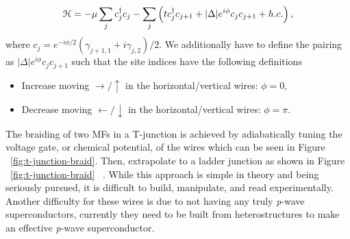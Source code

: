 \begin{equation}
  \mathcal{H} = -\mu \sum_j c^{\dagger}_j c_j - \sum_j \left(tc^{\dagger}_j c_{j+1} + |\Delta|e^{i\phi} c_j c_{j+1} + h.c. \right),
\end{equation}
where
$c_j = e^{-i\phi/2} (\gamma_{j+1,1} + i \gamma_{j,2})/2$.
We additionally have to define the pairing as
$|\Delta|e^{i\phi} c_j c_{j+1}$
such that the site indices have the following definitions
\begin{itemize}
  \item Increase moving $\rightarrow / \uparrow$ in the horizontal/vertical wires: $\phi = 0$,
  \item Decrease moving $\leftarrow / \downarrow$ in the horizontal/vertical wires: $\phi = \pi$.
\end{itemize}
The braiding of two MFs in a T-junction is achieved by adiabatically tuning the voltage gate, or chemical potential, of the wires which can be seen in Figure ~\ref{fig:t-junction-braid}.
Then, extrapolate to a ladder junction as shown in Figure ~\ref{fig:t-junction-braid} ~\cite{aliceaNonAbelianStatisticsTopological2011}.
While this approach is simple in theory and being seriously pursued, it is difficult to build, manipulate, and read experimentally.
Another difficulty for these wires is due to not having any truly \textit{p}-wave superconductors, currently they need to be built from heterostructures to make an effective \textit{p}-wave superconductor.

